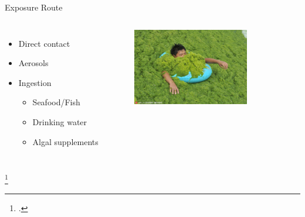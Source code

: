 \begin{frame}{Exposure Route}
	\begin{columns}
	\begin{itemize}
		\item Direct contact
		\item Aerosols
		\item Ingestion
		\begin{itemize}
			\item Seafood/Fish 
			\item Drinking water
			\item Algal supplements
		\end{itemize}
	\end{itemize}
	\begin{figure}
		\centering
		\includegraphics[width=2in]{swim.jpg}
	\end{figure}
\end{columns}
\footcitetext{[a], rastogi_cyanotoxin-microcystins:_2014}
\end{frame}

